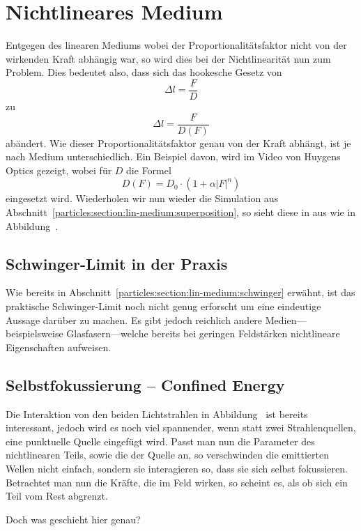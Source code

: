 %
%
%
%
\section{Nichtlineares Medium
\label{particles:section:nichtlinear}}
Entgegen des linearen Mediums wobei der Proportionalitätsfaktor nicht von der wirkenden Kraft abhängig war, 
so wird dies bei der Nichtlinearität nun zum Problem.
Dies bedeutet also, dass sich das hookesche Gesetz von 
\[
    \Delta l
    = 
    \frac{F}{D}
\]
zu
\[
    \Delta l
    = 
    \frac{F}{D(F)}
\]
abändert. 
Wie dieser Proportionalitätsfaktor genau von der Kraft abhängt, 
ist je nach Medium unterschiedlich.
Ein Beispiel davon, wird im Video  von Huygens Optics gezeigt,
wobei für $D$ die Formel 
\[
    D(F)
    =
    D_0
    \cdot
    (1 + \alpha |F|^n)
\]
eingesetzt wird.
Wiederholen wir nun wieder die Simulation aus Abschnitt~\ref{particles:section:lin-medium:superposition}, 
so sieht diese in aus wie in Abbildung~.


\subsection{Schwinger-Limit in der Praxis}
Wie bereits in Abschnitt~\ref{particles:section:lin-medium:schwinger} erwähnt, 
ist das praktische Schwinger-Limit noch nicht genug erforscht um eine eindeutige Aussage darüber zu machen.
Es gibt jedoch reichlich andere Medien---beispielsweise Glasfasern---welche bereits bei geringen Feldstärken nichtlineare Eigenschaften aufweisen.


\subsection{Selbstfokussierung -- Confined Energy}
Die Interaktion von den beiden Lichtstrahlen in Abbildung~
ist bereits interessant, jedoch wird es noch viel spannender, 
wenn statt zwei Strahlenquellen, eine punktuelle Quelle eingefügt wird.
Passt man nun die Parameter des nichtlinearen Teils, sowie die der Quelle an, 
so verschwinden die emittierten Wellen nicht einfach, 
sondern sie interagieren so, dass sie sich selbst fokussieren.
Betrachtet man nun die Kräfte, die im Feld wirken, 
so scheint es, als ob sich ein Teil vom Rest abgrenzt.

Doch was geschieht hier genau? 

